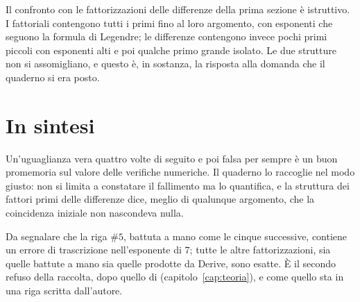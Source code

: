 Il confronto con le fattorizzazioni delle differenze della prima sezione è istruttivo. I fattoriali contengono tutti i primi fino al loro argomento, con esponenti che seguono la formula di Legendre; le differenze contengono invece pochi primi piccoli con esponenti alti e poi qualche primo grande isolato. Le due strutture non si assomigliano, e questo è, in sostanza, la risposta alla domanda che il quaderno si era posto.

\section*{In sintesi}

Un'uguaglianza vera quattro volte di seguito e poi falsa per sempre è un buon promemoria sul valore delle verifiche numeriche. Il quaderno lo raccoglie nel modo giusto: non si limita a constatare il fallimento ma lo quantifica, e la struttura dei fattori primi delle differenze dice, meglio di qualunque argomento, che la coincidenza iniziale non nascondeva nulla.

Da segnalare che la riga $\#5$, battuta a mano come le cinque successive, contiene un errore di trascrizione nell'esponente di $7$; tutte le altre fattorizzazioni, sia quelle battute a mano sia quelle prodotte da Derive, sono esatte. È il secondo refuso della raccolta, dopo quello di  (capitolo~\ref{cap:teoria}), e come quello sta in una riga scritta dall'autore.

